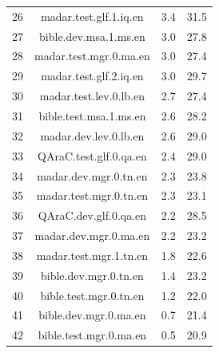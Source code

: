 \begin{table}[htbp]
\begin{tabular}{l@{\hspace{3pt}}c@{\hspace{3pt}}c@{\hspace{3pt}}c}
26 & madar.test.glf.1.iq.en & 3.4 & 31.5 \\
27 & bible.dev.msa.1.ms.en & 3.0 & 27.8 \\
28 & madar.test.mgr.0.ma.en & 3.0 & 27.4 \\
29 & madar.test.glf.2.iq.en & 3.0 & 29.7 \\
30 & madar.test.lev.0.lb.en & 2.7 & 27.4 \\
31 & bible.test.msa.1.ms.en & 2.6 & 28.2 \\
32 & madar.dev.lev.0.lb.en & 2.6 & 29.0 \\
33 & QAraC.test.glf.0.qa.en & 2.4 & 29.0 \\
34 & madar.dev.mgr.0.tn.en & 2.3 & 23.8 \\
35 & madar.test.mgr.0.tn.en & 2.3 & 23.1 \\
36 & QAraC.dev.glf.0.qa.en & 2.2 & 28.5 \\
37 & madar.dev.mgr.0.ma.en & 2.2 & 23.2 \\
38 & madar.test.mgr.1.tn.en & 1.8 & 22.6 \\
39 & bible.dev.mgr.0.tn.en & 1.4 & 23.2 \\
40 & bible.test.mgr.0.tn.en & 1.2 & 22.0 \\
41 & bible.dev.mgr.0.ma.en & 0.7 & 21.4 \\
42 & bible.test.mgr.0.ma.en & 0.5 & 20.9 \\
\bottomrule
\end{tabular}
\end{table}